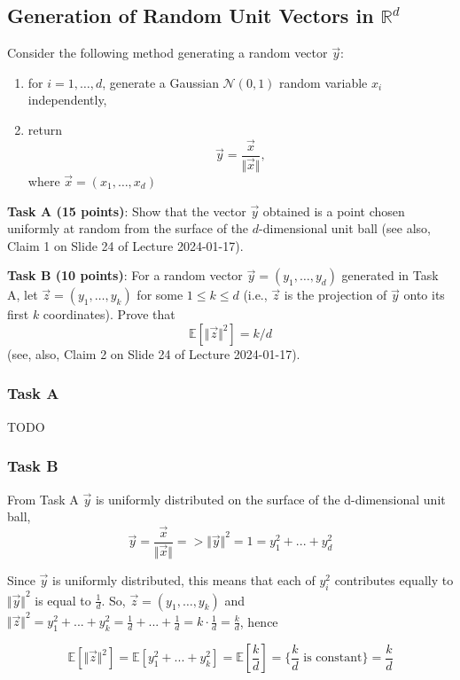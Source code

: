 \documentclass{article}
\newcommand{\R}{\mathbb{R}}
\begin{document}
  \subsection{Generation of Random Unit Vectors in $\R^d$}
  \begin{centerframebox}
    Consider the following method generating a random vector $\vec{y}$:
    \begin{enumerate}
      \item for $i = 1,\dots, d$, generate a Gaussian $\mathcal{N}(0, 1)$ random variable $x_i$
      independently,
      \item return \[ \vec{y} = \frac{\vec{x}}{\Vert\vec{x}\Vert}, \] where $\vec{x} = (x_1,\dots,x_d)$
    \end{enumerate}

    \textbf{Task A (15 points)}: Show that the vector $\vec{y}$ obtained is a point chosen uniformly at random from the surface of the $d$-dimensional unit ball (see also, Claim 1 on Slide 24 of Lecture 2024-01-17).

    \textbf{Task B (10 points)}: For a random vector $\vec{y} = (y_1,\dots,y_d)$ generated in Task A,
    let $\vec{z} = (y_1, \dots, y_k)$ for some $1 \leq k \leq d$ (i.e., $\vec{z}$ is the projection of $\vec{y}$ onto
    its first $k$ coordinates). Prove that
    \[\mathbb{E}\left[\Vert\vec{z}\Vert^2\right] = k/d\]
    (see, also, Claim 2 on Slide 24 of Lecture 2024-01-17).
  \end{centerframebox}
  \subsubsection{Task A}
  TODO %
  \subsubsection{Task B}
    From Task A $\vec{y}$ is uniformly distributed on the surface of the d-dimensional unit ball, \[ \vec{y} = \frac{\vec{x}}{\Vert\vec{x}\Vert} => {\Vert\vec{y}\Vert}^2 = 1 = y^2_1 + ... + y^2_d \]

    Since $\vec{y}$ is uniformly distributed, this means that each of $y^2_i$ contributes equally to ${\Vert\vec{y}\Vert}^2$ is equal to $\frac{1}{d}$. So, $\vec{z} = (y_1, \dots, y_k)$ and ${\Vert\vec{z}\Vert}^2 = y^2_1 + ... + y^2_k = \frac{1}{d} + ... + \frac{1}{d} = k \cdot \frac{1}{d} = \frac{k}{d}$, hence

    \[\mathbb{E}\left[\Vert\vec{z}\Vert^2\right] = \mathbb{E}\left[y^2_1 + ... + y^2_k\right] = \mathbb{E}\left[\frac{k}{d}\right] = \{\frac{k}{d} \text{ is constant}\} = \frac{k}{d}\]
\end{document}
